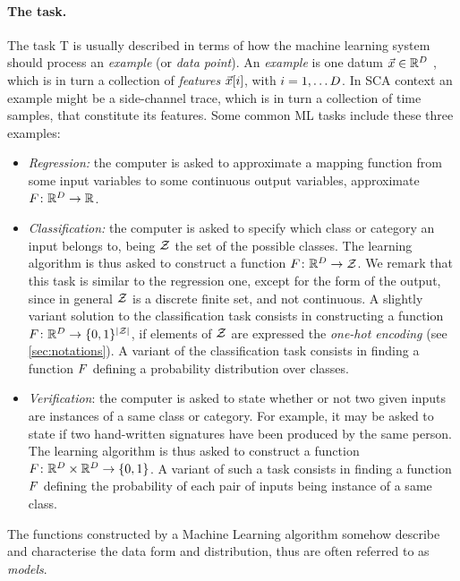 \paragraph*{The task.} The task T is usually described in terms of how the machine learning system should process an \emph{example} (or \emph{data point}). An \emph{example} is one datum $\vec{x}\in \mathbb{R}^D$ , which is in turn a collection of \emph{features} $\vec{x}[i]$, with  $i=1,\dots D$. In SCA context an example might be a side-channel trace, which is in turn a collection of time samples, that constitute its features. Some common ML tasks include these three examples: 
\begin{itemize}
\item \emph{Regression: } the computer is asked to approximate a mapping function from some input variables to some continuous output variables, \eg approximate $F\colon \mathbb{R}^D \rightarrow \mathbb{R}$.
\item \emph{Classification: } the computer is asked to specify which class or category an input belongs to, being $\mathcal{Z}$ the set of the possible classes. The learning algorithm is thus asked to construct a function $F\colon \mathbb{R}^D \rightarrow \mathcal{Z}$. We remark that this task is similar to the regression one, except for the form of the output, since in general $\mathcal{Z}$ is a discrete finite set, and not continuous. A slightly variant solution to the classification task consists in constructing a function $F\colon \mathbb{R}^D \rightarrow \{0,1\}^{\lvert\mathcal{Z}\rvert}$, if elements of $\mathcal{Z}$ are expressed \via the \emph{one-hot encoding} (see \ref{sec:notations}). A variant of the classification task consists in finding a function $F$ defining a probability distribution over classes.
\item \emph{Verification}: the computer is asked to state whether or not two given inputs are instances of a same class or category. For example, it may be asked to state if two hand-written signatures have been produced by the same person. The learning algorithm is thus asked to construct a function $F\colon \mathbb{R}^D \times \mathbb{R}^{D}\rightarrow \{0,1\}$. A variant of such a task consists in finding a function $F$ defining the probability of each pair of inputs being instance of a same class. 
\end{itemize}
The functions constructed by a Machine Learning algorithm somehow describe and characterise the data form and distribution, thus are often referred to as \emph{models}.

